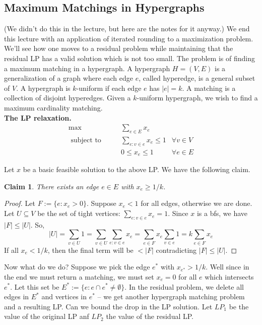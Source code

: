 \documentclass[11pt]{article}
\newtheorem{claim}{Claim}
\begin{document}
\subsection*{Maximum Matchings in Hypergraphs}
(We didn't do this in the lecture, but here are the notes for it anyway.)
We end this lecture with an application of iterated rounding to a maximization problem. We'll see how one moves to a residual problem while maintaining that the residual LP has a valid solution which is not too small.
The problem is of finding a maximum matching in a hypergraph. A hypergraph $H=(V,E)$ is a generalization 
of a graph where each edge $e$, called hyperedge, is a general subset of $V$. A hypergraph is $k$-uniform if each edge $e$ has $|e|=k$. A matching is a collection of disjoint hyperedges. Given a $k$-uniform hypergraph, we wish to find a maximum cardinality matching.  \\

\noindent
{\bf The LP relaxation.} 
\begin{align}
\max & \qquad \sum_{e\in E} x_e & \label{lp:hypmatch} \\
\textrm{ subject to} & \qquad \sum_{e:v\in e} x_e \le 1 &\forall v\in V \label{c1:hypmatch} \\
& \qquad 0 \le x_e \le 1 &  \forall e \in E
\end{align}

Let $x$ be a basic feasible solution to the above LP. We have the following claim.

\begin{claim}
There exists an edge $e\in E$ with $x_e \ge 1/k$.
\end{claim}
\begin{proof}
Let $F:=\{e: x_e > 0\}$. Suppose $x_e < 1$ for all edges, otherwise we are done. Let $U\subseteq V$ be the set of tight vertices: $\sum_{e:v\in e} x_e = 1$. Since $x$ is a bfs, we have $|F| \le |U|$.
So, 
$$|U| = \sum_{v\in U} 1 = \sum_{v\in U}\sum_{e:v\in e} x_e = \sum_{e\in F} x_e \sum_{v\in e} 1 = k \sum_{e\in F} x_e$$
If all $x_e < 1/k$, then the final term will be $< |F|$ contradicting $|F| \le |U|$.
\end{proof}
\noindent
\def\e{{e^*}}
Now what do we do? Suppose we pick the edge $\e$ with $x_\e > 1/k$. Well since in the end we must return a matching, we must set $x_e = 0$ for all $e$ which intersects $\e$. Let this set be $E^* := \{e: e\cap \e \neq \emptyset\}$. In the residual problem, we delete all edges in $E^*$ and vertices in $\e$ -- we get another hypergraph matching problem and a resulting LP. Can we bound the drop in the LP solution. Let $LP_1$ be the value of the original LP anf $LP_2$ the value of the residual LP.
\end{document}
